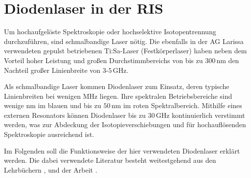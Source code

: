 \section{Diodenlaser in der RIS}\label{sec:diodenlaser}
Um hochaufgelöste Spektroskopie oder hochselektive Isotopentrennung
durchzuführen, sind schmalbandige Laser nötig. Die ebenfalls in der AG Larissa
verwendeten gepulst betriebenen Ti:Sa-Laser (Festkörperlaser) haben neben dem
Vorteil hoher Leistung und großen Durchstimmbereichs von bis zu $300\,$nm den
Nachteil großer Linienbreite von $3$-$5\,$GHz.\par
Als schmalbandige Laser kommen Diodenlaser zum Einsatz, deren typische
Linienbreiten bei wenigen MHz liegen. Ihre spektralen Betriebsbereiche sind
wenige nm im blauen und bis zu $50\,$nm im roten Spektralbereich. Mithilfe eines externen Resonators können Diodenlaser bis zu $30\,$GHz kontinuierlich
verstimmt werden, was zur Abdeckung der Isotopieverschiebungen und für
hochauflösenden Spektroskopie ausreichend ist.\par
Im Folgenden soll die Funktionsweise der hier verwendeten Diodenlaser erklärt
werden. Die dabei verwendete Literatur besteht weitestgehend aus den Lehrbüchern
\cite{demtroeder:ex3}, \cite{chow:semiconductor-laser} und der Arbeit
\cite{schumann:2001:diplomarbeit}.

